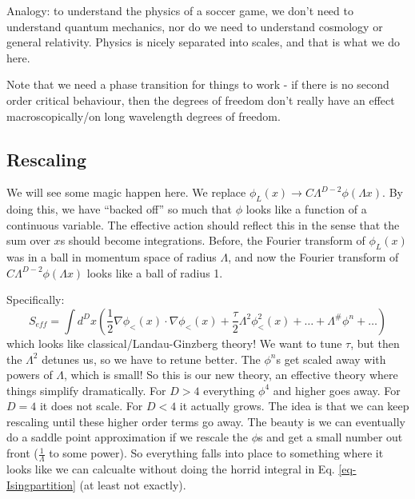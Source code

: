 Analogy: to understand the physics of a soccer game, we don't need to understand quantum mechanics, nor do we need to understand cosmology or general relativity. Physics is nicely separated into scales, and that is what we do here.

Note that we need a phase transition for things to work - if there is no second order critical behaviour, then the degrees of freedom don't really have an effect macroscopically/on long wavelength degrees of freedom.

\subsection{Rescaling}
We will see some magic happen here. We replace $\phi_L(x) \to C\Lambda^{D-2}\phi(\Lambda x)$. By doing this, we have ``backed off'' so much that $\phi$ looks like a function of a continuous variable. The effective action should reflect this in the sense that the sum over $x$s should become integrations. Before, the Fourier transform of $\phi_L(x)$ was in a ball in momentum space of radius $\Lambda$, and now the Fourier transform of $C\Lambda^{D-2}\phi(\Lambda x)$ looks like a ball of radius 1.

Specifically:
\begin{equation}
    S_{eff} = \int d^D x\left(\frac{1}{2}\nabla \phi_< (x) \cdot \nabla \phi_< (x) + \frac{\tau}{2}\Lambda^2\phi^2_<(x) + \ldots + \Lambda^{\#}\phi^n +\ldots \right)
\end{equation}
which looks like classical/Landau-Ginzberg theory! We want to tune $\tau$, but then the $\Lambda^2$ detunes us, so we have to retune better. The $\phi^n$s get scaled away with powers of $\Lambda$, which is small! So this is our new theory, an effective theory where things simplify dramatically. For $D > 4$ everything $\phi^4$ and higher goes away. For $D = 4$ it does not scale. For $D < 4$ it actually grows. The idea is that we can keep rescaling until these higher order terms go away. The beauty is we can eventually do a saddle point approximation if we rescale the $\phi$s and get a small number out front ($\frac{1}{\Lambda}$ to some power). So everything falls into place to something where it looks like we can calcualte without doing the horrid integral in Eq. \eqref{eq-Isingpartition} (at least not exactly).